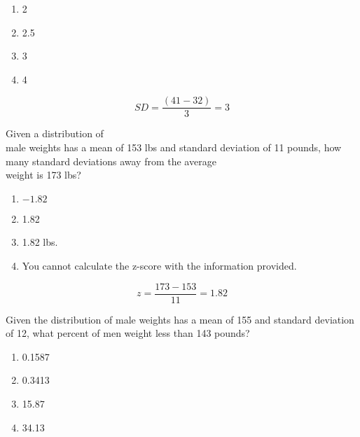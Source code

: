 \documentclass[11pt]{book}\usepackage[]{graphicx}\usepackage[]{color}
\begin{document}
\begin{exercises}
\begin{exercise}
	  \begin{enumerate}
	  \item 2
	  \item 2.5
	  \item 3
	  \item 4
	  \end{enumerate}
	  
    
	\end{exercise}
	\begin{solution}   %
	
	  \begin{equation}
	    SD = \frac{(41 - 32)}{3} = 3
	  \end{equation}
	  
	\end{solution}

  \begin{exercise} %

    Given a distribution of \\ male weights  has a mean of 153 lbs and standard deviation of 11 pounds, how many standard deviations away from the average \\ weight is 173 lbs?

	  \begin{enumerate}
	  \item $-1.82$
	  \item 1.82
	  \item 1.82 lbs.
	  \item You cannot calculate the z-score with the information provided.
	  \end{enumerate}

    
	\end{exercise}
	\begin{solution}   %
	
	  \begin{equation*}
	    z = \frac{173 - 153}{11} = 1.82
	  \end{equation*}
	  
	\end{solution}

  \begin{exercise} %

    Given the distribution of  male weights has a mean of 155 and standard deviation of 12, what percent
of men weight less than 143 pounds?

	  \begin{enumerate}
	  \item 0.1587
	  \item 0.3413
	  \item 15.87
	  \item 34.13
	  \end{enumerate}
	  \vspace{2mm}
	\end{exercise}
	\begin{solution}   %


\end{solution}
\end{exercises}
\end{document}
